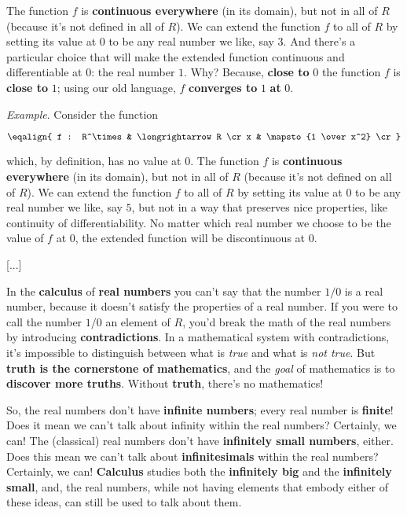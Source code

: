 The function $f$ is {\bf continuous everywhere} (in its domain), but not in all of $R$ (because it's not defined in all of $R$). We can extend the function $f$ to all of $R$ by setting its value at $0$ to be any real number we like, say $3$. And there's a particular choice that will make the extended function continuous and differentiable at $0$: the real number $1$. Why? Because, {\bf close to} $0$ the function $f$ is {\bf close to} $1$; using our old language, $f$ {\bf converges to} $1$ {\bf at} $0$. 


{\it Example}. Consider the function

$$\eqalign{
  f : R^\times & \longrightarrow R \cr
  x            & \mapsto {1 \over x^2} \cr
}$$


which, by definition, has no value at $0$. The function $f$ is {\bf continuous everywhere} (in its domain), but not in all of $R$ (because it's not defined on all of $R$). We can extend the function $f$ to all of $R$ by setting its value at $0$ to be any real number we like, say $5$, but not in a way that preserves nice properties, like continuity of differentiability. No matter which real number we choose to be the value of $f$ at $0$, the extended function will be discontinuous at $0$.


[...]

\vskip8pt
In the {\bf calculus} of {\bf real numbers} you can't say that the number $1/0$ is a real number, because it doesn't satisfy the properties of a real number. If you were to call the number $1/0$ an element of $R$, you'd break the math of the real numbers by introducing {\bf contradictions}. In a mathematical system with contradictions, it's impossible to distinguish between what is {\it true} and what is {\it not true}. But {\bf truth is the cornerstone of mathematics}, and the {\it goal} of mathematics is to {\bf discover more truths}. Without {\bf truth}, there's no mathematics!

So, the real numbers don't have {\bf infinite numbers}; every real number is {\bf finite}! Does it mean we can't talk about infinity within the real numbers? Certainly, we can! The (classical) real numbers don't have {\bf infinitely small numbers}, either. Does this mean we can't talk about {\bf infinitesimals} within the real numbers? Certainly, we can! {\bf Calculus} studies both the {\bf infinitely big} and the {\bf infinitely small}, and, the real numbers, while not having elements that embody either of these ideas, can still be used to talk about them.

